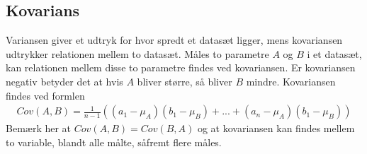 \subsection{Kovarians}
Variansen giver et udtryk for hvor spredt et datasæt ligger, mens kovariansen udtrykker relationen mellem to datasæt. Måles to parametre $A$ og $B$ i et datasæt, kan relationen mellem disse to parametre findes ved kovariansen. Er kovariansen negativ betyder det at hvis $A$ bliver større, så bliver $B$ mindre. Kovariansen findes ved formlen
\begin{align}
Cov(A,B) = \frac{1}{n - 1}((a_1 - \mu_A)(b_1 - \mu_B) + ... + (a_n - \mu_A)(b_1 - \mu_B))
\label{eq:covarians}
\end{align}
Bemærk her at $Cov(A,B)=Cov(B,A)$ og at kovariansen kan findes mellem to variable, blandt alle målte, såfremt flere måles. 
